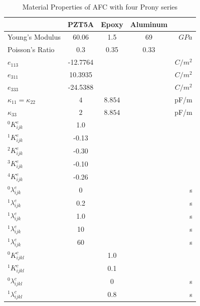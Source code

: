 \begin{table}
\caption{Material Properties of AFC with four Prony series}
\centering
\begin{tabular}{|l|c|c|c|r|}
\hline
               & PZT5A & Epoxy & Aluminum & \\ \hline 
Young's Modulus&60.06 & 1.5     & 69       &$GPa$    \\ \hline
Poisson's Ratio&$0.3$ & 0.35    & 0.33 &\\ \hline 
$e_{113}$      &-12.7764 &         &      &$C/m^2$\\ \hline
$e_{311}$      &10.3935&         &      &$C/m^2$\\ \hline
$e_{333}$      &-24.5388  &         &      &$C/m^2$\\ \hline
$\kappa_{11}=\kappa_{22}$ &  $ 4  $ & $8.854  $ & &  pF/m \\ \hline
$\kappa_{33}$ & $2  $              & $8.854  $ & &  pF/m \\ \hline
${}^{0}K_{ijk}^{e}$&1.0& & &  \\ \hline
${}^{1}K_{ijk}^{e}$&-0.13& & & \\ \hline
${}^{2}K_{ijk}^{e}$&-0.30& & & \\ \hline
${}^{3}K_{ijk}^{e}$&-0.10& & & \\ \hline
${}^{4}K_{ijk}^{e}$&-0.26& & & \\ \hline
${}^{0}\lambda_{ijk}^{e}$&0& & & s \\ \hline
${}^{1}\lambda_{ijk}^{e}$&0.2& & & s \\ \hline 
${}^{1}\lambda_{ijk}^{e}$&1.0& & & s \\ \hline 
${}^{1}\lambda_{ijk}^{e}$&10& & & s \\ \hline 
${}^{1}\lambda_{ijk}^{e}$&60& & & s \\ \hline 
${}^{0}K_{ijkl}^{c}$& &1.0 & &  \\ \hline
${}^{1}K_{ijkl}^{c}$& &0.1 & & \\ \hline
${}^{0}\lambda_{ijkl}^{c}$& &0&  & s\\ \hline
${}^{1}\lambda_{ijkl}^{c}$& &0.8 & & s \\ \hline 
\end{tabular}
\label{table:afc_freq_xp_model:fig}
\end{table} 
 
\clearpage